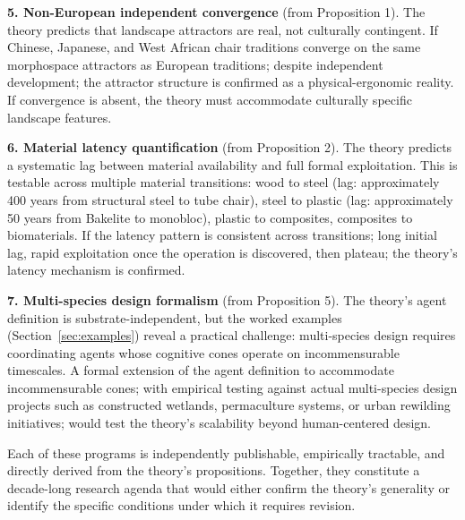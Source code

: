 \textbf{5. Non-European independent convergence} (from Proposition 1). The theory predicts that landscape attractors are real, not culturally contingent. If Chinese, Japanese, and West African chair traditions converge on the same morphospace attractors as European traditions; despite independent development; the attractor structure is confirmed as a physical-ergonomic reality. If convergence is absent, the theory must accommodate culturally specific landscape features.

\textbf{6. Material latency quantification} (from Proposition 2). The theory predicts a systematic lag between material availability and full formal exploitation. This is testable across multiple material transitions: wood to steel (lag: approximately 400 years from structural steel to tube chair), steel to plastic (lag: approximately 50 years from Bakelite to monobloc), plastic to composites, composites to biomaterials. If the latency pattern is consistent across transitions; long initial lag, rapid exploitation once the operation is discovered, then plateau; the theory's latency mechanism is confirmed.

\textbf{7. Multi-species design formalism} (from Proposition 5). The theory's agent definition is substrate-independent, but the worked examples (Section~\ref{sec:examples}) reveal a practical challenge: multi-species design requires coordinating agents whose cognitive cones operate on incommensurable timescales. A formal extension of the agent definition to accommodate incommensurable cones; with empirical testing against actual multi-species design projects such as constructed wetlands, permaculture systems, or urban rewilding initiatives; would test the theory's scalability beyond human-centered design.

Each of these programs is independently publishable, empirically tractable, and directly derived from the theory's propositions. Together, they constitute a decade-long research agenda that would either confirm the theory's generality or identify the specific conditions under which it requires revision.

